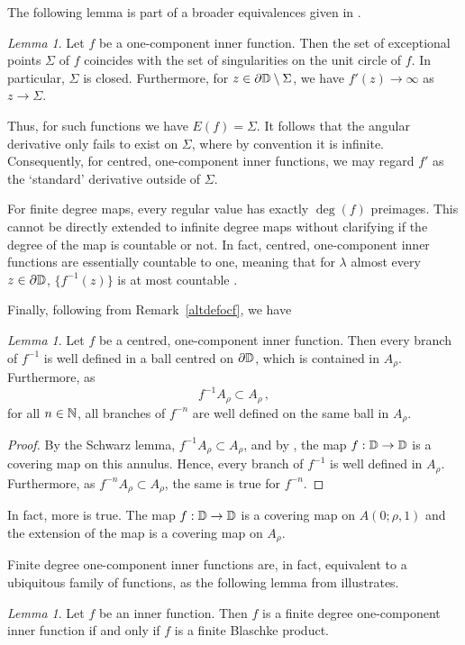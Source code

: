 \documentclass[11pt,reqno]{amsart}
\newcommand{\N}{{\Bbb N}}
\newcommand{\D}{{\Bbb D}}
\newcommand{\0}{\mathbf{0}}
\newtheorem{lemma}{Lemma}
\theoremstyle{remark}
\numberwithin{equation}{section}
\newtheorem{lemma}[theorem]{Lemma}
\theoremstyle{remark}
\numberwithin{equation}{section}
\begin{document}
The following lemma is part of a broader equivalences given in \cite[Theorem~7.2 (d)]{urb}. 
 \begin{lemma}\label{svep}
    Let $f$ be a one-component inner function. Then the set of exceptional points $\Sigma$ of $f$ coincides with the set of singularities on the unit circle of $f$. In particular, $\Sigma$ is closed. Furthermore, for  $z \in \partial \D \setminus \Sigma$, we have $f'(z) \to \infty$ as $z \to \Sigma$.
 \end{lemma}
Thus, for such functions we have $E(f)=\Sigma$. It follows that the angular derivative only fails to exist on $\Sigma$, where by convention it is infinite. Consequently, for centred, one-component inner functions, we may regard $f'$ as the `standard' derivative outside of $\Sigma$. 

For finite degree maps, every regular value has exactly $\deg(f)$ preimages. This cannot be directly extended to infinite degree maps without clarifying if the degree of the map is countable or not. In fact, centred, one-component inner functions are essentially countable to one, meaning that for $\lambda$ almost every $z \in \partial \D$, $\{f^{-1}(z)\}$ is at most countable \cite[Corollary~3.3]{urb}.

Finally, following from Remark~\ref{altdefocf}, we have 
\begin{lemma}\label{annul}
 Let $f$ be a centred, one-component inner function. Then every branch of $f^{-1}$ is well defined in a ball centred on $\partial \D$, which is contained in $A_\rho$. Furthermore, as $$f^{-1}A_\rho \subset A_\rho \, , $$  for all $n \in \N$, all branches of $f^{-n}$ are well defined on the same ball in $A_\rho$.
\end{lemma}
\begin{proof}
    By the Schwarz lemma, $f^{-1}A_\rho \subset A_\rho$, and by \cite[Lemma~7.1]{urb}, the map $f: \D \to \D$ is a covering map on this annulus. Hence, every branch of $f^{-1}$ is well defined in $A_\rho$. Furthermore, as $f^{-n}A_\rho \subset A_\rho$, the same is true for $f^{-n}$.
\end{proof} 
In fact, more is true. The map $f: \D \to \D$ is a covering map on $A(0;\rho,1)$ and the extension of the map is a covering map on $A_\rho$.

Finite degree one-component inner functions are, in fact, equivalent to a ubiquitous family of functions, as the following lemma from \cite{CM} illustrates.
\begin{lemma}\label{foc}
Let $f$ be an inner function. Then $f$ is a finite degree one-component inner function if and only if $f$ is a finite Blaschke product.
\end{lemma}
\end{document}
